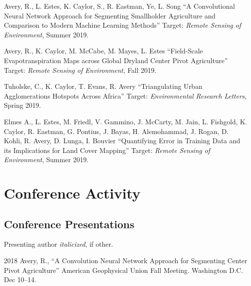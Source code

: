 \documentclass[12pt,letterpaper]{report}
\begin{document}
	\begin{tablist}
				
		\item[\the\year] \tab Avery, R., L. Estes, K. Caylor, S., R. Eastman, Ye, L. Song \enquote{A Convolutional Neural Network Approach for Segmenting Smallholder Agriculture and Comparison to Modern Machine Learning Methods} Target: \textit{Remote Sensing of Environment}, Summer 2019.
		
		\item[\the\year] \tab Avery, R., K. Caylor, M. McCabe, M. Mayes, L. Estes \enquote{Field-Scale Evapotranspiration Maps across Global Dryland Center Pivot Agriculture} Target: \textit{Remote Sensing of Environment}, Fall 2019.
		
		\item[\the\year] \tab Tuholske, C., K. Caylor, T. Evans, R. Avery \enquote{Triangulating Urban Agglomerations Hotspots Across Africa} Target: \textit{Environmental Research Letters}, Spring 2019.

	        \item[\the\year] \tab Elmes A., L. Estes, M. Friedl, V. Gammino, J. McCarty, M. Jain, L. Fishgold, K. Caylor, R. Eastman, G. Pontius, J. Bayas, H. Alemohammad, J. Rogan, D. Kohli, R. Avery, D. Lunga, I. Bouvier   \enquote{Quantifying Error in Training Data and its Implications for Land Cover Mapping} Target: \textit{Remote Sensing of Environment}, Summer 2019.
	
	\end{tablist}
	

	
    	\section*{Conference Activity}
	
	
	\subsection*{Conference Presentations}
	
	Presenting author \textit{italicized}, if other.\bigskip
	
	\begin{tablist}
		
		\item[2018] \tab Avery, R.,  \enquote{A Convolution Neural Network Approach for Segmenting Center Pivot Agriculture} American Geophysical Union Fall Meeting. Washington D.C. Dec 10--14.
						
	\end{tablist}
	
\end{document}
